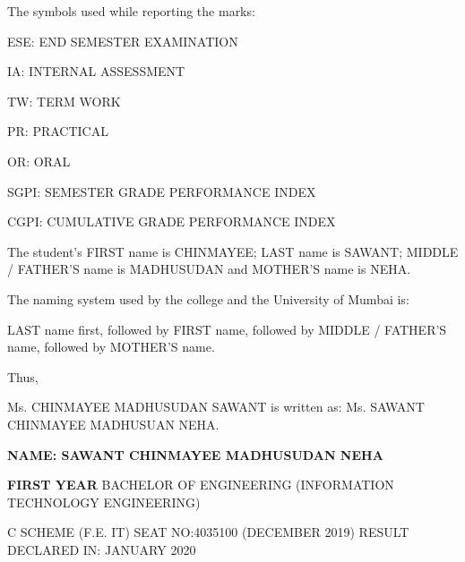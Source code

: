 \documentclass{article} %
\begin{document}
\textbf{}

\noindent The symbols used while reporting the marks:

\noindent 

\noindent ESE: END SEMESTER EXAMINATION   

\noindent IA: INTERNAL ASSESSMENT

\noindent TW: TERM WORK

\noindent PR: PRACTICAL

\noindent OR: ORAL

\noindent SGPI: SEMESTER GRADE PERFORMANCE INDEX

\noindent CGPI: CUMULATIVE GRADE PERFORMANCE INDEX

\noindent 

\noindent {} The student's FIRST name is CHINMAYEE; LAST name is SAWANT; MIDDLE / FATHER'S name is MADHUSUDAN and MOTHER'S name is NEHA.

\noindent The naming system used by the college and the University of Mumbai is:

\noindent 

\noindent LAST name first, followed by FIRST name, followed by MIDDLE / FATHER'S name, followed by MOTHER'S name.

\noindent 

\noindent Thus,

\noindent Ms. CHINMAYEE MADHUSUDAN SAWANT is written as: Ms. SAWANT CHINMAYEE MADHUSUAN NEHA. 

\noindent \eject 

\noindent \textbf{\underbar{}}

\noindent \textbf{}

\noindent 

\noindent \textbf{NAME: SAWANT CHINMAYEE MADHUSUDAN NEHA}

\noindent 

\noindent \textbf{FIRST YEAR} BACHELOR OF ENGINEERING (INFORMATION TECHNOLOGY ENGINEERING)

\noindent 

\noindent \textbf{}  C SCHEME (F.E. IT)      SEAT NO:4035100 (DECEMBER 2019)       RESULT DECLARED IN: JANUARY 2020

\noindent 

\noindent 
\end{document}
